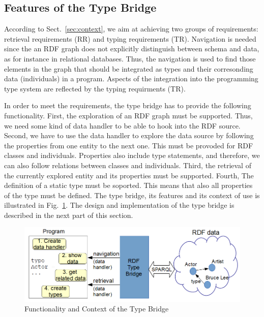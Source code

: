 \documentclass{llncs} %
\begin{document}
\subsection{Features of the Type Bridge}
  
According to Sect.~\ref{sec:context}, we aim at achieving two groups of requirements:
retrieval requirements (RR) and typing requirements (TR). Navigation is needed since the an RDF graph does not explicitly 
distinguish between schema and data, as for instance in relational databases. Thus, the navigation is
used to find those elements in the graph that should be integrated as types and their corresonding data (individuals) in a program.
Aspects of the integration into the programming type system are reflected by the typing requirments (TR).

In order to meet the requirements, the type bridge has to provide the following functionality.
First, the exploration of an RDF graph must be supported. Thus, we need some kind of data handler
to be able to hook into the RDF source. Second, we have to use the data handler to explore the data source by
following the properties from one entity to the next one. This must be provoded for RDF classes and individuals.
Properties also include type statements, and therefore,
we can also follow relations between classes and individuals.
Third, the retrieval of the currently explored entity and its properties must be supported.
Fourth, The definition of a static type must be soported. This means that also all properties of
the type must be defined.
The type bridge, its features and its context of use is illustrated in Fig.~\ref{fig:context}.
The design and implementation of the type bridge is described in the next part of this section.

\begin{figure}
	\centering
		\includegraphics[width=0.98\linewidth]{./figs/context.png}
	\caption{Functionality and Context of the Type Bridge}
	\label{fig:context}
\end{figure}
\end{document}
